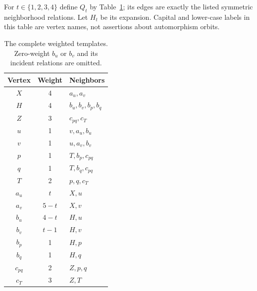 \documentclass[11pt]{article}
\begin{document}
For $t\in\{1,2,3,4\}$ define $Q_t$ by Table~\ref{quotient}; its edges
are exactly the listed symmetric neighborhood relations. Let $H_t$
be its expansion. Capital and lower-case labels in this table are
vertex names, not assertions about automorphism orbits.

\begin{table}[h]
\centering
\begin{tabular}{ccl}
\toprule
Vertex&Weight&Neighbors\\\midrule
$X$&4&$a_u,a_v$\\
$H$&4&$b_u,b_v,b_p,b_q$\\
$Z$&3&$c_{pq},c_T$\\
$u$&1&$v,a_u,b_u$\\
$v$&1&$u,a_v,b_v$\\
$p$&1&$T,b_p,c_{pq}$\\
$q$&1&$T,b_q,c_{pq}$\\
$T$&2&$p,q,c_T$\\\midrule
$a_u$&$t$&$X,u$\\
$a_v$&$5-t$&$X,v$\\
$b_u$&$4-t$&$H,u$\\
$b_v$&$t-1$&$H,v$\\
$b_p$&1&$H,p$\\
$b_q$&1&$H,q$\\
$c_{pq}$&2&$Z,p,q$\\
$c_T$&3&$Z,T$\\\bottomrule
\end{tabular}
\caption{The complete weighted templates. Zero-weight $b_u$ or $b_v$
and its incident relations are omitted.}\label{quotient}
\end{table}
\end{document}
